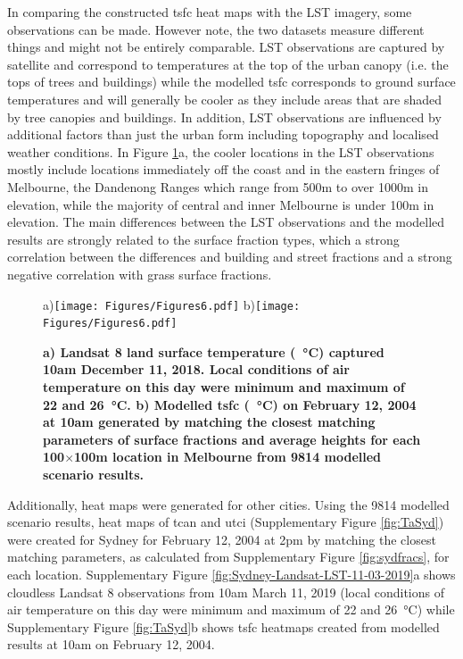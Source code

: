 \documentclass[final,3p,times,authoryear]{elsarticle}
\begin{document}
In comparing the constructed \gls{tsfc} heat maps with the LST imagery, some observations can be made. However note, the two datasets measure different things and might not be entirely comparable. LST observations are captured by satellite and correspond to temperatures at the top of the urban canopy (i.e. the tops of trees and buildings) while the modelled \gls{tsfc} corresponds to ground surface temperatures and will generally be cooler as they include areas that are shaded by tree canopies and buildings. In addition, LST observations are influenced by additional factors than just the urban form including topography and localised weather conditions. In Figure \ref{fig:Melb_TSFC12_85}a, the cooler locations in the LST observations mostly include locations immediately off the coast and in the eastern fringes of Melbourne, the Dandenong Ranges which range from 500m to over 1000m in elevation, while the majority of central and inner Melbourne is under 100m in elevation. The main differences between the LST observations and the modelled results are strongly related to the surface fraction types, which a strong correlation between the differences and building and street fractions and a strong negative correlation with grass surface fractions. 

\begin{figure}
\centering
a)\texttt{[image: Figures/Figures6.pdf]}
b)\texttt{[image: Figures/Figures6.pdf]}
\caption{\bf a) Landsat 8 land surface temperature (\SI{}{\degreeCelsius}) captured 10am December 11, 2018. Local conditions of air temperature on this day were minimum and maximum of 22 and 26\SI{}{\degreeCelsius}. b) Modelled \gls{tsfc} (\SI{}{\degreeCelsius}) on February 12, 2004 at 10am generated by matching the closest matching parameters of surface fractions and average heights for each 100$\times$100m location in Melbourne from 9814 modelled scenario results.}
 \label{fig:Melb_TSFC12_85}
\end{figure}


Additionally, heat maps were generated for other cities. Using the 9814 modelled scenario results, heat maps of \gls{tcan} and \gls{utci} (Supplementary Figure \ref{fig:TaSyd}) were created for Sydney for February 12, 2004 at 2pm by matching the closest matching parameters, as calculated from Supplementary Figure \ref{fig:sydfracs}, for each location. Supplementary Figure \ref{fig:Sydney-Landsat-LST-11-03-2019}a shows cloudless Landsat 8 observations from 10am March 11, 2019 (local conditions of air temperature on this day were minimum and maximum of 22 and 26\SI{}{\degreeCelsius}) while Supplementary Figure \ref{fig:TaSyd}b shows \gls{tsfc} heatmaps created from modelled results at 10am on February 12, 2004. 
\end{document}
